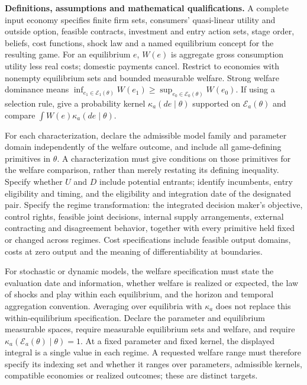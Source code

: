 \documentclass[11pt,a4paper]{article}
\begin{document}
\textbf{Definitions, assumptions and mathematical qualifications.} A complete input economy specifies finite firm sets, consumers' quasi-linear utility and outside option, feasible contracts, investment and entry action sets, stage order, beliefs, cost functions, shock law and a named equilibrium concept for the resulting game. For an equilibrium \(e\), \(W(e)\) is aggregate gross consumption utility less real costs; domestic payments cancel. Restrict to economies with nonempty equilibrium sets and bounded measurable welfare. Strong welfare dominance means \(\inf_{e_1\in\mathcal E_1(\theta)}W(e_1)\geq\sup_{e_0\in\mathcal E_0(\theta)}W(e_0)\). If using a selection rule, give a probability kernel \(\kappa_a(de\mid\theta)\) supported on \(\mathcal E_a(\theta)\) and compare \(\int W(e)\kappa_a(de\mid\theta)\).

For each characterization, declare the admissible model family and parameter domain independently of the welfare outcome, and include all game-defining primitives in \(\theta\). A characterization must give conditions on those primitives for the welfare comparison, rather than merely restating its defining inequality. Specify whether \(U\) and \(D\) include potential entrants; identify incumbents, entry eligibility and timing, and the eligibility and integration date of the designated pair. Specify the regime transformation: the integrated decision maker's objective, control rights, feasible joint decisions, internal supply arrangements, external contracting and disagreement behavior, together with every primitive held fixed or changed across regimes. Cost specifications include feasible output domains, costs at zero output and the meaning of differentiability at boundaries.

For stochastic or dynamic models, the welfare specification must state the evaluation date and information, whether welfare is realized or expected, the law of shocks and play within each equilibrium, and the horizon and temporal aggregation convention. Averaging over equilibria with \(\kappa_a\) does not replace this within-equilibrium specification. Declare the parameter and equilibrium measurable spaces, require measurable equilibrium sets and welfare, and require \(\kappa_a(\mathcal E_a(\theta)\mid\theta)=1\). At a fixed parameter and fixed kernel, the displayed integral is a single value in each regime. A requested welfare range must therefore specify its indexing set and whether it ranges over parameters, admissible kernels, compatible economies or realized outcomes; these are distinct targets.
\end{document}
